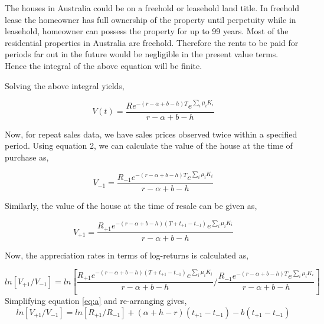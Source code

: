 \documentclass[AEJ,reqno, draftmode]{AEA} %
\begin{document}
The houses in Australia could be on a freehold or leasehold land title. In freehold lease the homeowner has full ownership of the property until perpetuity while in leasehold, homeowner can possess the property for up to 99 years. Most of the residential properties in Australia are freehold. Therefore the rents to be paid for periods far out in the future would be negligible in the present value terms. Hence the integral of the above equation will be finite. 

Solving the above integral yields,

\begin{equation}
    V(t) = \frac{R e^{-(r-\alpha+b-h)T} e^{\sum_{i} \mu_i K_i}}{r-\alpha+b-h}
\end{equation}

Now, for repeat sales data, we have sales prices observed twice within a specified period. Using equation 2, we can calculate the value of the house at the time of purchase as,

\begin{equation}
    V_{-1} = \frac{R_{-1} e^{-(r-\alpha+b-h)T} e^{\sum_{i} \mu_i K_i}}{r-\alpha+b-h}
\end{equation}

Similarly, the value of the house at the time of resale can be given as,

\begin{equation}
    V_{+1} = \frac{R_{+1} e^{-(r-\alpha+b-h)(T+t_{+1}-t_{-1})} e^{\sum_{i} \mu_i K_i}}{r-\alpha+b-h}
\end{equation}

Now, the appreciation rates in terms of log-returns is calculated as,

\begin{equation} \label{eq:a}
    ln [V_{+1}/V_{-1}] = ln [\frac{R_{+1} e^{-(r-\alpha+b-h)(T+t_{+1}-t_{-1})} e^{\sum_{i} \mu_i K_i}}{r-\alpha+b-h} / \frac{R_{-1} e^{-(r-\alpha+b-h)T} e^{\sum_{i} \mu_i K_i}}{r-\alpha+b-h}]
\end{equation}
Simplifying equation \ref{eq:a} and re-arranging gives,
\begin{equation}
    ln [V_{+1}/V_{-1}] = ln [R_{+1}/R_{-1}] + (\alpha+h-r)(t_{+1}-t_{-1}) - b(t_{+1}-t_{-1}) 
\end{equation}
\end{document}
